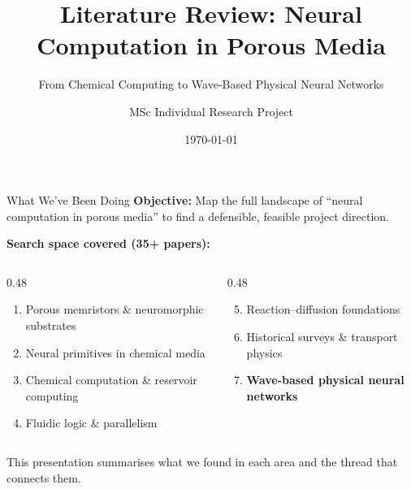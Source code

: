 \documentclass[aspectratio=169,11pt]{beamer}
\title{Literature Review: Neural Computation in Porous Media}
\subtitle{From Chemical Computing to Wave-Based Physical Neural Networks}
\author{MSc Individual Research Project}
\institute{Cranfield University\hspace{0.3cm}|\hspace{0.3cm}Supervisors: Prof. Weisi Guo, Prof. Takis Tsoutsanis}
\date{\today}
\begin{document}
\begin{frame}[plain]
  \titlepage
\end{frame}

\begin{frame}{What We've Been Doing}
  \textbf{Objective:} Map the full landscape of ``neural computation in porous media'' to find a defensible, feasible project direction.

  \vspace{0.3cm}
  \textbf{Search space covered (35+ papers):}
  \begin{columns}[T]
    \begin{column}{0.48\textwidth}
      \footnotesize
      \begin{enumerate}
        \item Porous memristors \& neuromorphic substrates
        \item Neural primitives in chemical media
        \item Chemical computation \& reservoir computing
        \item Fluidic logic \& parallelism
      \end{enumerate}
    \end{column}
    \begin{column}{0.48\textwidth}
      \footnotesize
      \begin{enumerate}
        \setcounter{enumi}{4}
        \item Reaction--diffusion foundations
        \item Historical surveys \& transport physics
        \item \textcolor{gdpDarkBlue}{\textbf{Wave-based physical neural networks}}
      \end{enumerate}
    \end{column}
  \end{columns}

  \vspace{0.2cm}
  \textcolor{gdpSlate}{\small This presentation summarises what we found in each area and the thread that connects them.}
\end{frame}
\end{document}
